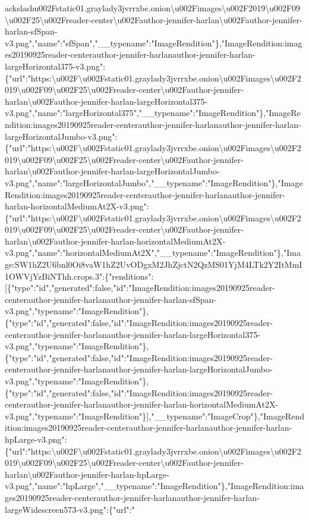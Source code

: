ackslash{}u002Fstatic01.graylady3jvrrxbe.onion\textbackslash{}u002Fimages\textbackslash{}u002F2019\textbackslash{}u002F09\textbackslash{}u002F25\textbackslash{}u002Freader-center\textbackslash{}u002Fauthor-jennifer-harlan\textbackslash{}u002Fauthor-jennifer-harlan-sfSpan-v3.png","name":"sfSpan","\_\_typename":"ImageRendition"\},"ImageRendition:images20190925reader-centerauthor-jennifer-harlanauthor-jennifer-harlan-largeHorizontal375-v3.png":\{"url":"https:\textbackslash{}u002F\textbackslash{}u002Fstatic01.graylady3jvrrxbe.onion\textbackslash{}u002Fimages\textbackslash{}u002F2019\textbackslash{}u002F09\textbackslash{}u002F25\textbackslash{}u002Freader-center\textbackslash{}u002Fauthor-jennifer-harlan\textbackslash{}u002Fauthor-jennifer-harlan-largeHorizontal375-v3.png","name":"largeHorizontal375","\_\_typename":"ImageRendition"\},"ImageRendition:images20190925reader-centerauthor-jennifer-harlanauthor-jennifer-harlan-largeHorizontalJumbo-v3.png":\{"url":"https:\textbackslash{}u002F\textbackslash{}u002Fstatic01.graylady3jvrrxbe.onion\textbackslash{}u002Fimages\textbackslash{}u002F2019\textbackslash{}u002F09\textbackslash{}u002F25\textbackslash{}u002Freader-center\textbackslash{}u002Fauthor-jennifer-harlan\textbackslash{}u002Fauthor-jennifer-harlan-largeHorizontalJumbo-v3.png","name":"largeHorizontalJumbo","\_\_typename":"ImageRendition"\},"ImageRendition:images20190925reader-centerauthor-jennifer-harlanauthor-jennifer-harlan-horizontalMediumAt2X-v3.png":\{"url":"https:\textbackslash{}u002F\textbackslash{}u002Fstatic01.graylady3jvrrxbe.onion\textbackslash{}u002Fimages\textbackslash{}u002F2019\textbackslash{}u002F09\textbackslash{}u002F25\textbackslash{}u002Freader-center\textbackslash{}u002Fauthor-jennifer-harlan\textbackslash{}u002Fauthor-jennifer-harlan-horizontalMediumAt2X-v3.png","name":"horizontalMediumAt2X","\_\_typename":"ImageRendition"\},"Image:SW1hZ2U6bnl0Oi8vaW1hZ2UvODgxM2JhZjctN2QzMS01YjM4LTk2Y2ItMmI1OWVjYzBiNThh.crops.3":\{"renditions":{[}\{"type":"id","generated":false,"id":"ImageRendition:images20190925reader-centerauthor-jennifer-harlanauthor-jennifer-harlan-sfSpan-v3.png","typename":"ImageRendition"\},\{"type":"id","generated":false,"id":"ImageRendition:images20190925reader-centerauthor-jennifer-harlanauthor-jennifer-harlan-largeHorizontal375-v3.png","typename":"ImageRendition"\},\{"type":"id","generated":false,"id":"ImageRendition:images20190925reader-centerauthor-jennifer-harlanauthor-jennifer-harlan-largeHorizontalJumbo-v3.png","typename":"ImageRendition"\},\{"type":"id","generated":false,"id":"ImageRendition:images20190925reader-centerauthor-jennifer-harlanauthor-jennifer-harlan-horizontalMediumAt2X-v3.png","typename":"ImageRendition"\}{]},"\_\_typename":"ImageCrop"\},"ImageRendition:images20190925reader-centerauthor-jennifer-harlanauthor-jennifer-harlan-hpLarge-v3.png":\{"url":"https:\textbackslash{}u002F\textbackslash{}u002Fstatic01.graylady3jvrrxbe.onion\textbackslash{}u002Fimages\textbackslash{}u002F2019\textbackslash{}u002F09\textbackslash{}u002F25\textbackslash{}u002Freader-center\textbackslash{}u002Fauthor-jennifer-harlan\textbackslash{}u002Fauthor-jennifer-harlan-hpLarge-v3.png","name":"hpLarge","\_\_typename":"ImageRendition"\},"ImageRendition:images20190925reader-centerauthor-jennifer-harlanauthor-jennifer-harlan-largeWidescreen573-v3.png":\{"url":"